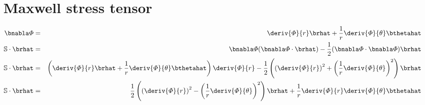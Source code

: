 \section{Maxwell stress tensor}
\begin{eqnarray}
\bnabla \varPhi &=& \deriv{\varPhi}{r} \brhat
+ \frac{1}{r} \deriv{\varPhi}{\theta} \bthetahat
\\
\mathbb{S} \cdot \brhat &=& \bnabla \varPhi (\bnabla \varPhi \cdot \brhat) -
\frac{1}{2} (\bnabla \varPhi \cdot \bnabla \varPhi) \brhat
\\
\mathbb{S} \cdot \brhat &=& \left(\deriv{\varPhi}{r} \brhat + \frac{1}{r} \deriv{\varPhi}{\theta}\bthetahat \right) \deriv{\varPhi}{r} -
\frac{1}{2} \left(\left(\deriv{\varPhi}{r}\right)^2 +
\left(\frac{1}{r} \deriv{\varPhi}{\theta} \right)^2 \right) \brhat
\\
\mathbb{S} \cdot \brhat &=&
\frac{1}{2} \left(\left(\deriv{\varPhi}{r}\right)^2 -
\left(\frac{1}{r} \deriv{\varPhi}{\theta} \right)^2\right) \brhat +
\frac{1}{r}\deriv{\varPhi}{r}\deriv{\varPhi}{\theta} \bthetahat
\end{eqnarray}


